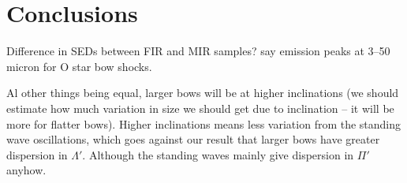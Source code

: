 
\section{Conclusions}
\label{sec:conclusion}

Difference in SEDs between FIR and MIR samples?  \citet{Meyer:2016a}
say emission peaks at 3--50 micron for O star bow shocks.

Al other things being equal, larger bows will be at higher
inclinations (we should estimate how much variation in size we should
get due to inclination -- it will be more for flatter bows).  Higher
inclinations means less variation from the standing wave oscillations,
which goes against our result that larger bows have greater dispersion
in \(\Lambda'\).  Although the standing waves mainly give dispersion in
\(\Pi'\) anyhow.

